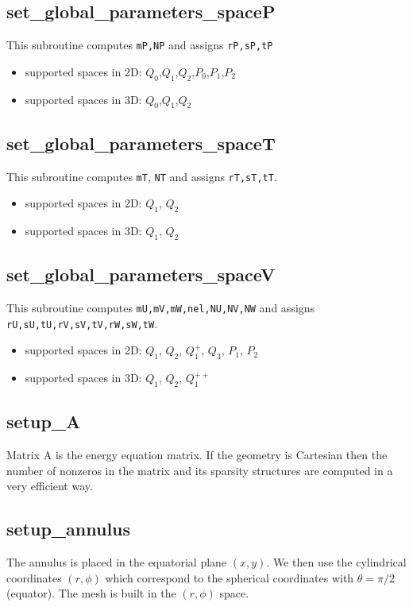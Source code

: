  \subsection{set\_global\_parameters\_spaceP}
 This subroutine computes {\tt mP,NP} and assigns {\tt rP,sP,tP}
 \begin{itemize}
 \item supported spaces in 2D: $Q_0$,$Q_1$,$Q_2$,$P_0$,$P_1$,$P_2$
 \item supported spaces in 3D: $Q_0$,$Q_1$,$Q_2$
 \end{itemize}
 \subsection{set\_global\_parameters\_spaceT}
 This subroutine computes {\tt mT}, {\tt NT} and assigns {\tt rT,sT,tT}.
 \begin{itemize}
 \item supported spaces in 2D: $Q_1$, $Q_2$
 \item supported spaces in 3D: $Q_1$, $Q_2$
 \end{itemize}
 \subsection{set\_global\_parameters\_spaceV}
 This subroutine computes {\tt mU,mV,mW,nel,NU,NV,NW} and assigns 
 {\tt rU,sU,tU,rV,sV,tV,rW,sW,tW}.
 \begin{itemize}
 \item supported spaces in 2D: $Q_1$, $Q_2$, $Q_1^+$, $Q_3$, $P_1$, $P_2$
 \item supported spaces in 3D: $Q_1$, $Q_2$, $Q_1^{++}$
 \end{itemize}
 \subsection{setup\_A}
 Matrix A is the energy equation matrix.
 If the geometry is Cartesian then the number of nonzeros in the matrix and its sparsity 
 structures are computed in a very efficient way. 
 \subsection{setup\_annulus}
 The annulus is placed in the equatorial plane $(x,y)$.
 We then use the cylindrical coordinates $(r,\phi)$ which correspond
 to the spherical coordinates with $\theta=\pi/2$ (equator).
 The mesh is built in the $(r,\phi)$ space.
